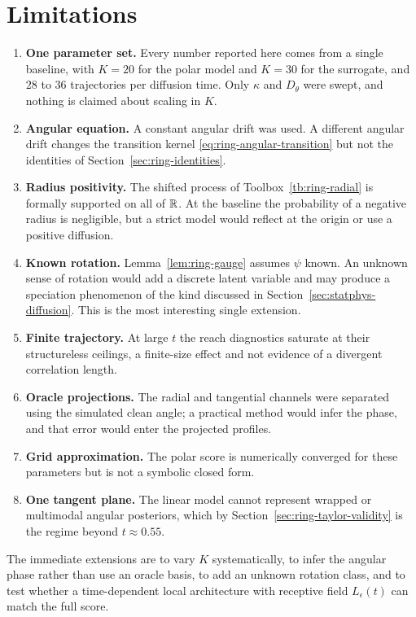 \section{Limitations}\label{sec:ring-limits}

\begin{enumerate}
  \item \textbf{One parameter set.} Every number reported here comes from a
  single baseline, with $K = 20$ for the polar model and $K = 30$ for the
  surrogate, and $28$ to $36$ trajectories per diffusion time. Only $\kappa$
  and $D_\theta$ were swept, and nothing is claimed about scaling in $K$.
  \item \textbf{Angular equation.} A constant angular drift was used. A
  different angular drift changes the transition kernel
  \eqref{eq:ring-angular-transition} but not the identities of
  Section~\ref{sec:ring-identities}.
  \item \textbf{Radius positivity.} The shifted process of
  Toolbox~\ref{tb:ring-radial} is formally supported on all of $\mathbb{R}$. At the
  baseline the probability of a negative radius is negligible, but a strict
  model would reflect at the origin or use a positive diffusion.
  \item \textbf{Known rotation.} Lemma~\ref{lem:ring-gauge} assumes $\psi$
  known. An unknown sense of rotation would add a discrete latent variable and
  may produce a speciation phenomenon of the kind discussed in
  Section~\ref{sec:statphys-diffusion}. This is the most interesting single
  extension.
  \item \textbf{Finite trajectory.} At large $t$ the reach diagnostics saturate
  at their structureless ceilings, a finite-size effect and not evidence of a
  divergent correlation length.
  \item \textbf{Oracle projections.} The radial and tangential channels were
  separated using the simulated clean angle; a practical method would infer the
  phase, and that error would enter the projected profiles.
  \item \textbf{Grid approximation.} The polar score is numerically converged
  for these parameters but is not a symbolic closed form.
  \item \textbf{One tangent plane.} The linear model cannot represent wrapped
  or multimodal angular posteriors, which by
  Section~\ref{sec:ring-taylor-validity} is the regime beyond
  $t \approx 0.55$.
\end{enumerate}

The immediate extensions are to vary $K$ systematically, to infer the angular
phase rather than use an oracle basis, to add an unknown rotation class, and to
test whether a time-dependent local architecture with receptive field
$L_\epsilon(t)$ can match the full score.
